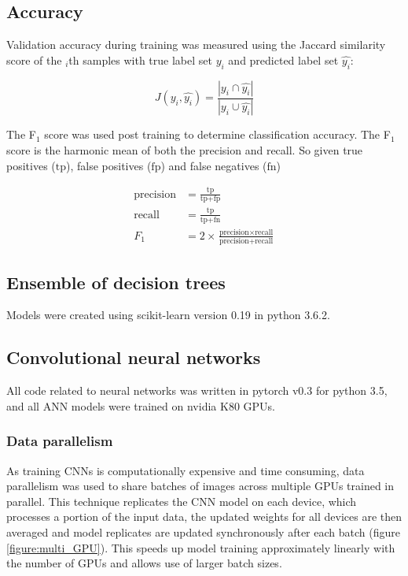 \documentclass[a4paper,11pt,twoside,openright]{scrbook}
\begin{document}
\subsection{Accuracy}
Validation accuracy during training was measured using the Jaccard similarity score of the $_i$th samples with true label set $y_i$ and predicted label set $\hat{y_i}$:

\begin{equation}
    J(y_i, \hat{y_i}) = \frac{|y_i \cap \hat{y_i}|}{|y_i \cup \hat{y_i}|}
\end{equation}

The F$_1$ score was used post training to determine classification accuracy.
The F$_1$ score is the harmonic mean of both the precision and recall.
So given true positives ($\text{tp}$), false positives ($\text{fp}$) and false negatives ($\text{fn}$)

\begin{align}
        \text{precision} &= \frac{ \text{tp} }{ \text{tp} + \text{fp} } \\
        \text{recall} &= \frac{\text{tp}}{\text{tp} + \text{fn}} \\
        F_1 &= 2 \times \frac{\text{precision} \times \text{recall}}{\text{precision} + \text{recall}}
\end{align}

\subsection{Ensemble of decision trees}
Models were created using scikit-learn version 0.19 in python 3.6.2.

\subsection{Convolutional neural networks}


All code related to neural networks was written in pytorch v0.3 for python 3.5, and all ANN models were trained on nvidia K80 GPUs.

\subsubsection{Data parallelism}
As training CNNs is computationally expensive and time consuming, data parallelism was used to share batches of images across multiple GPUs trained in parallel.
This technique replicates the CNN model on each device, which processes a portion of the input data, the updated weights for all devices are then averaged and model replicates are updated synchronously after each batch (figure \ref{figure:multi_GPU}).
This speeds up model training approximately linearly with the number of GPUs and allows use of larger batch sizes.
\end{document}
